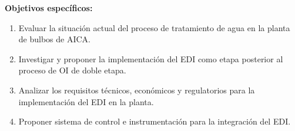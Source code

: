 \textbf{Objetivos específicos:}
\begin{enumerate}
    \item Evaluar la situación actual del proceso de
          tratamiento de agua en la planta de bulbos de AICA.
    \item Investigar y proponer la implementación del EDI
          como etapa posterior al proceso de OI de doble etapa.
    \item Analizar los requisitos técnicos, económicos y regulatorios
          para la implementación del EDI en la planta.
    \item Proponer sistema de control e instrumentación para la
          integración del EDI.
\end{enumerate}
